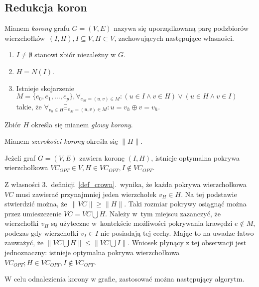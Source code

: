 \subsection{Redukcja koron}\label{ss_kernelization_crown_reduction}
\begin{definition}
  Mianem \emph{korony} grafu $G=(V, E)$ nazywa się uporządkowaną parę
  podzbiorów wierzchołków $(I, H), I \subseteq V, H \subset V$, zachowujących
  następujące własności.
  \begin{enumerate}
    \item $I \neq \emptyset$ stanowi zbiór niezależny w $G$.
    \item $H=N(I)$.
    \item Istnieje skojarzenie $M=\{e_0, e_1, \ldots, e_p\}, \forall_{e_M=(u,v) \in
      M}: (u\in I \land v\in H) \lor (u \in H \land v \in I)$ takie, że
      $\forall_{v_h \in H}\exists_{e_M=(u,v)\in M}: u = v_h \oplus v = v_h$.
  \end{enumerate}
\end{definition}
\begin{definition}
  Zbiór $H$ określa się mianem \emph{głowy korony}.
\end{definition}
\begin{definition}
  Mianem \emph{szerokości korony} określa się $\|H\|$.
\end{definition}
\begin{theorem}
  Jeżeli graf $G=(V,E)$ zawiera koronę $(I,H)$, istnieje optymalna pokrywa 
  wierzchołkowa $VC_{OPT} \in V, H \in VC_{OPT}, I \notin VC_{OPT}$.
\end{theorem}
\begin{bproof}
  Z własności 3.\ definicji~\ref{def_crown}.\ wynika, że każda pokrywa 
  wierzchołkowa $VC$ musi zawierać przynajmniej jeden wierzchołek $v_H \in H$.
  Na tej podstawie stwierdzić można, że $\|VC\|\geq\|H\|$.
  Taki rozmiar pokrywy osiągnąć można przez umieszczenie $VC=VC\bigcup H$.
  Należy w~tym miejscu zazanczyć, że wierzchołki $v_H$ są użyteczne w~kontekście
  możliwości pokrywania krawędzi $e \notin M$, podczas gdy wierzchołki $v_I \in
  I$ nie posiadają tej cechy.
  Mając to na uwadze łatwo zauważyć, że $\|VC \bigcup H\| \leq \|VC \bigcup
  I\|$.
  Wniosek płynący z tej obserwacji jest jednoznaczny: istnieje optymalna pokrywa
  wierzchołkowa $VC_{OPT}; H \in VC_{OPT}, I \notin VC_{OPT}$.
\end{bproof}
W celu odnalezienia korony w grafie, zastosować można następujący algorytm.
